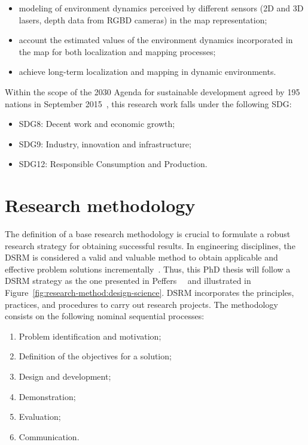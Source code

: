\begin{itemize}[nosep]
\item modeling of environment dynamics perceived by different sensors (2D and 3D lasers, depth data from RGBD cameras) in the map representation;
\item account the estimated values of the environment dynamics incorporated in the map for both localization and mapping processes;
\item achieve long-term localization and mapping in dynamic environments.
\end{itemize}

Within the scope of the 2030 Agenda for sustainable development agreed by 195 nations in September 2015~\cite{un:agenda-2030:sdg}, this research work falls under the following \gls{SDG}:

\begin{itemize}[nosep]
\item SDG8: Decent work and economic growth;
\item SDG9: Industry, innovation and infrastructure;
\item SDG12: Responsible Consumption and Production.
\end{itemize}






\section{Research methodology}\label{sec:research-method:intro}

The definition of a base research methodology is crucial to formulate a robust research strategy for obtaining successful results.
In engineering disciplines, the \gls{DSRM} is considered a valid and valuable method to obtain applicable and effective problem solutions incrementally~\cite{research-methodology:design-science}.
Thus, this PhD thesis will follow a \gls{DSRM} strategy as the one presented in Peffers~\etal~\cite{research-methodology:design-science} and illustrated in Figure~\ref{fig:research-method:design-science}.
\gls{DSRM} incorporates the principles, practices, and procedures to carry out research projects. The methodology consists on the following nominal sequential processes:

\begin{enumerate}[nosep]
\item Problem identification and motivation;
\item Definition of the objectives for a solution;
\item Design and development;
\item Demonstration;
\item Evaluation;
\item Communication.
\end{enumerate}

